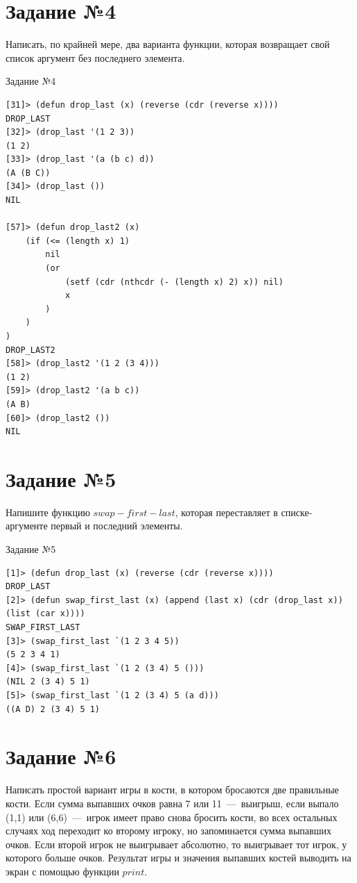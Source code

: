\section{Задание №4}
Написать, по крайней мере, два варианта функции, которая возвращает свой список аргумент без последнего элемента.

\begin{code}
\caption{Задание №4}
\label{code:bf4}
\begin{verbatim}
[31]> (defun drop_last (x) (reverse (cdr (reverse x))))
DROP_LAST
[32]> (drop_last '(1 2 3))
(1 2)
[33]> (drop_last '(a (b c) d))
(A (B C))
[34]> (drop_last ())
NIL

[57]> (defun drop_last2 (x)
    (if (<= (length x) 1)
        nil
        (or
            (setf (cdr (nthcdr (- (length x) 2) x)) nil)
            x
        )
    )
)
DROP_LAST2
[58]> (drop_last2 '(1 2 (3 4)))
(1 2)
[59]> (drop_last2 '(a b c))
(A B)
[60]> (drop_last2 ())
NIL
\end{verbatim}
\end{code}

\section{Задание №5}
Напишите функцию $swap-first-last$, которая переставляет в списке- аргументе первый и последний элементы.

\begin{code}
\caption{Задание №5}
\label{code:bf5}
\begin{verbatim}
[1]> (defun drop_last (x) (reverse (cdr (reverse x))))
DROP_LAST
[2]> (defun swap_first_last (x) (append (last x) (cdr (drop_last x)) 
(list (car x))))
SWAP_FIRST_LAST
[3]> (swap_first_last `(1 2 3 4 5))
(5 2 3 4 1)
[4]> (swap_first_last `(1 2 (3 4) 5 ()))
(NIL 2 (3 4) 5 1)
[5]> (swap_first_last `(1 2 (3 4) 5 (a d)))
((A D) 2 (3 4) 5 1)
\end{verbatim}
\end{code}

\section{Задание №6}
Написать простой вариант игры в кости, в котором бросаются две правильные кости. Если сумма выпавших очков равна 7 или 11~---~выигрыш, если выпало (1,1) или (6,6)~---~игрок имеет право снова бросить кости, во всех остальных случаях ход переходит ко второму игроку, но запоминается сумма выпавших очков. Если второй игрок не выигрывает абсолютно, то выигрывает тот игрок, у которого больше очков. Результат игры и значения выпавших костей выводить на экран с помощью функции $print$.

